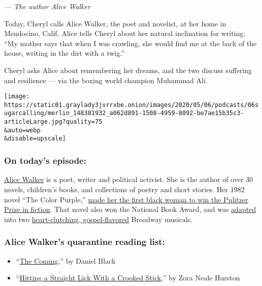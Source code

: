 \emph{--- The author Alice Walker}

Today, Cheryl calls Alice Walker, the poet and novelist, at her home in
Mendocino, Calif. Alice tells Cheryl about her natural inclination for
writing: ``My mother says that when I was crawling, she would find me at
the back of the house, writing in the dirt with a twig.''

Cheryl asks Alice about remembering her dreams, and the two discuss
suffering and resilience --- via the boxing world champion Muhammad Ali.

\texttt{[image: https://static01.graylady3jvrrxbe.onion/images/2020/05/06/podcasts/06sugarcalling/merlin\_148381932\_a062d891-1508-4959-8092-be7ae15b35c3-articleLarge.jpg?quality=75\\\&auto=webp\\\&disable=upscale]}

\hypertarget{on-todays-episode}{%
\subsubsection{\texorpdfstring{\textbf{On today's
episode:}}{On today's episode:}}\label{on-todays-episode}}

\href{https://alicewalkersgarden.com/}{Alice Walker} is a poet, writer
and political activist. She is the author of over 30 novels, children's
books, and collections of poetry and short stories. Her 1982 novel ``The
Color Purple,''
\href{https://www.nytimes3xbfgragh.onion/2004/10/24/books/review/alice-walker-in-love-and-trouble.html}{made
her the first black woman to win the Pulitzer Prize in fiction}. That
novel also won the National Book Award, and was
\href{https://www.nytimes3xbfgragh.onion/2005/12/02/theater/reviews/one-womans-awakening-in-double-time.html}{adapted}
into two
\href{https://www.nytimes3xbfgragh.onion/2015/12/11/theater/review-the-color-purple-on-broadway-stripped-to-its-essence.html}{heart-clutching,
gospel-flavored} Broadway musicals.

\hypertarget{alice-walkers-quarantine-reading-list}{%
\subsubsection{\texorpdfstring{\textbf{Alice Walker's quarantine reading
list:}}{Alice Walker's quarantine reading list:}}\label{alice-walkers-quarantine-reading-list}}

\begin{itemize}
\item
  ``\href{https://us.macmillan.com/books/9781466890671}{The Coming},''
  by Daniel Black
\item
  ``\href{https://www.harpercollins.com/9780062915795/hitting-a-straight-lick-with-a-crooked-stick/}{Hitting
  a Straight Lick With a Crooked Stick},'' by Zora Neale Hurston
\end{itemize}

